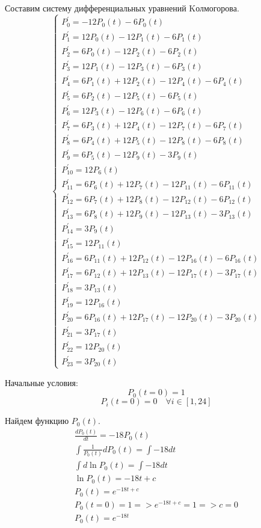 Составим систему дифференциальных уравнений Kолмогорова.
\[
\begin{cases}
    P^\prime_{0} =-12P_{0} (t) -6P_{0} (t) \\ 
P^\prime_{1} = 12P_{0} (t) -12P_{1} (t) -6P_{1} (t) \\ 
P^\prime_{2} = 6P_{0} (t) -12P_{2} (t) -6P_{2} (t) \\ 
P^\prime_{3} = 12P_{1} (t) -12P_{3} (t) -6P_{3} (t) \\ 
P^\prime_{4} = 6P_{1} (t) +12P_{2} (t) -12P_{4} (t) -6P_{4} (t) \\ 
P^\prime_{5} = 6P_{2} (t) -12P_{5} (t) -6P_{5} (t) \\ 
P^\prime_{6} = 12P_{3} (t) -12P_{6} (t) -6P_{6} (t) \\ 
P^\prime_{7} = 6P_{3} (t) +12P_{4} (t) -12P_{7} (t) -6P_{7} (t) \\ 
P^\prime_{8} = 6P_{4} (t) +12P_{5} (t) -12P_{8} (t) -6P_{8} (t) \\ 
P^\prime_{9} = 6P_{5} (t) -12P_{9} (t) -3P_{9} (t) \\ 
P^\prime_{10} = 12P_{6} (t) \\ 
P^\prime_{11} = 6P_{6} (t) +12P_{7} (t) -12P_{11} (t) -6P_{11} (t) \\ 
P^\prime_{12} = 6P_{7} (t) +12P_{8} (t) -12P_{12} (t) -6P_{12} (t) \\ 
P^\prime_{13} = 6P_{8} (t) +12P_{9} (t) -12P_{13} (t) -3P_{13} (t) \\ 
P^\prime_{14} = 3P_{9} (t) \\ 
P^\prime_{15} = 12P_{11} (t) \\ 
P^\prime_{16} = 6P_{11} (t) +12P_{12} (t) -12P_{16} (t) -6P_{16} (t) \\ 
P^\prime_{17} = 6P_{12} (t) +12P_{13} (t) -12P_{17} (t) -3P_{17} (t) \\ 
P^\prime_{18} = 3P_{13} (t) \\ 
P^\prime_{19} = 12P_{16} (t) \\ 
P^\prime_{20} = 6P_{16} (t) +12P_{17} (t) -12P_{20} (t) -3P_{20} (t) \\ 
P^\prime_{21} = 3P_{17} (t) \\ 
P^\prime_{22} = 12P_{20} (t) \\ 
P^\prime_{23} = 3P_{20} (t) 
\end{cases}
\]

Начальные условия:
$$P_0(t=0)=1$$
$$P_i(t=0)=0 \quad \forall i \in [1, 24]$$

Найдем функцию $P_0(t)$.
\begin{gather*}
    \frac{dP_0(t)}{dt} = -18 P_0 (t)\\
    \int \frac{1}{P_0 (t)} d P_0(t) = \int -18 dt\\
    \int d \ln P_0 (t) = \int -18 dt\\
    \ln P_0 (t) = -18 t + c\\
    P_0 (t) = e^{-18 t + c}\\
    P_0(t = 0) = 1 => e^{-18 t + c} = 1 => c = 0\\
    P_0 (t) = e^{-18 t}\\
\end{gather*}

